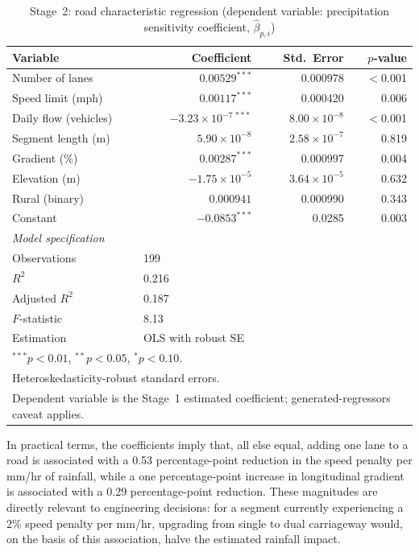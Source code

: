 \documentclass[review,authoryear]{elsarticle}
\begin{document}
\begin{table}[htbp]
\centering
\caption{Stage~2: road characteristic regression (dependent variable: precipitation sensitivity coefficient, $\hat{\beta}_{p,i}$)}
\label{tab:features}
\begin{tabular}{lrrr}
\toprule
Variable & Coefficient & Std.\ Error & $p$-value \\
\midrule
Number of lanes          & $0.00529^{***}$   & 0.000978  & $<$0.001  \\
Speed limit (mph)        & $0.00117^{***}$   & 0.000420  & 0.006  \\
Daily flow (vehicles)    & $-3.23 \times 10^{-7\,***}$ & $8.00 \times 10^{-8}$ & $<$0.001  \\
Segment length (m)       & $5.90 \times 10^{-8}$       & $2.58 \times 10^{-7}$ & 0.819  \\
Gradient (\%)            & $0.00287^{***}$   & 0.000997  & 0.004  \\
Elevation (m)            & $-1.75 \times 10^{-5}$      & $3.64 \times 10^{-5}$ & 0.632  \\
Rural (binary)           & $0.000941$        & 0.000990  & 0.343  \\
Constant                 & $-0.0853^{***}$   & 0.0285    & 0.003  \\
\midrule
\textit{Model specification} \\
Observations             & \multicolumn{2}{l}{199} \\
$R^2$                    & \multicolumn{2}{l}{0.216} \\
Adjusted $R^2$           & \multicolumn{2}{l}{0.187} \\
$F$-statistic            & \multicolumn{2}{l}{8.13} \\
Estimation               & \multicolumn{2}{l}{OLS with robust SE} \\
\bottomrule
\multicolumn{4}{l}{\footnotesize $^{***}p < 0.01$, $^{**}p < 0.05$, $^{*}p < 0.10$.} \\
\multicolumn{4}{l}{\footnotesize Heteroskedasticity-robust standard errors.} \\
\multicolumn{4}{l}{\footnotesize Dependent variable is the Stage~1 estimated coefficient; generated-regressors caveat applies.} \\
\end{tabular}
\end{table}

In practical terms, the coefficients imply that, all else equal, adding one lane to a road is associated with a 0.53 percentage-point reduction in the speed penalty per \si{mm/hr} of rainfall, while a one percentage-point increase in longitudinal gradient is associated with a 0.29 percentage-point reduction. These magnitudes are directly relevant to engineering decisions: for a segment currently experiencing a 2\% speed penalty per \si{mm/hr}, upgrading from single to dual carriageway would, on the basis of this association, halve the estimated rainfall impact.
\end{document}
